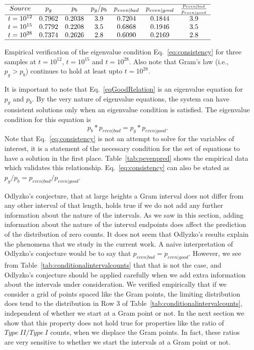 \documentclass[twoside]{article}
\theoremstyle{definition}
\begin{document}
\begin{table}
\centering \(\begin{array}{ccccccc}
\hline
Source &p_g&p_b& p_g/p_b&p_{even|bad} &p_{even|good}&\frac{p_{even|bad}}{p_{even|good}}\\
\hline
t = 10^{12}&0.7962&0.2038&3.9&0.7204&0.1844&3.9\\
t = 10^{15}&0.7792&0.2208&3.5&0.6868&0.1946&3.5\\
t = 10^{28}&0.7374&0.2626&2.8&0.6090&0.2169&2.8\\
\hline
\end{array}\)
\caption{Empirical verification of  the eigenvalue condition Eq.~\ref{eq:consistency} for three samples at $t=10^{12}$, $t=10^{15}$  and $t=10^{28}$. Also note that Gram's law (i.e., $p_g > p_b$)  continues to hold
at least upto  $t = 10^{28}$.} 
\label{tab:pevenpred}
\end{table}
 It is important to note that Eq.~\ref{eqGoodRelation} is an eigenvalue equation for  $p_g$ and $p_b$. By the very nature of eigenvalue equations, the system can have consistent solutions only when an eigenvalue condition is satisfied. The eigenvalue condition for this equation is
\begin{equation}
p_b*p_{even|bad} = p_g*p_{even|good}.
\label{eq:consistency}
\end{equation}
 Note that Eq.~\ref{eq:consistency} is not an attempt to solve for the variables of interest, it is a statement of the  necessary condition
 for the set of equations to have a solution in the first place. Table~\ref{tab:pevenpred} shows the empirical data which validates this relationship. Eq.~\ref{eq:consistency} can also be stated as $p_g/p_b = p_{even|bad} /p_{even|good}$.

Odlyzko's conjecture,  that at large heights a Gram interval does not differ from any other interval of that length, holds true if we do not add any 
further information about the nature of the intervals. As we saw in this section, adding information about the nature of the interval endpoints does affect the prediction of the
distribution of zero counts. It does not seem that Odlyzko's results explain the phenomena that we study in the current work. A naive interpretation
of Odlyzko's conjecture would be to say that $p_{even|bad}  = p_{even|good}$. However,  we see from Table~\ref{tab:conditionalintervalcounts}  that
that is not the case, and Odlyzko's conjecture should be applied carefully when we add extra information about the intervals under consideration.
We verified empirically that if we consider a  grid of points spaced like the Gram points, the limiting distribution does tend to the distribution
in Row 3 of Table~\ref{tab:conditionalintervalcounts}, independent of whether we start at a Gram point or not. In the next section we show that this
property does not hold true for properties like  the ratio of $Type~II/Type~I$ counts, when we displace the Gram points. In fact, these ratios
are very sensitive to whether we start the intervals at a Gram point or not.
\end{document}
